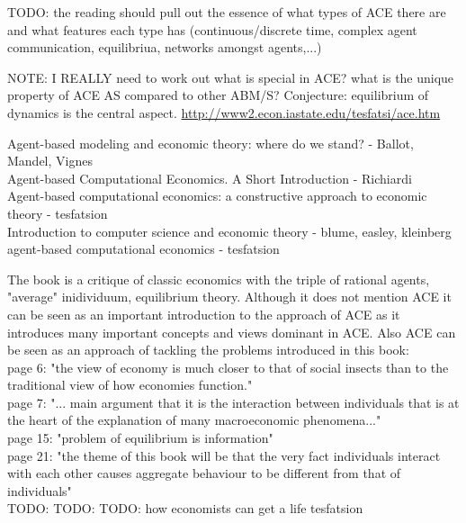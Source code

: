 TODO: the reading should pull out the essence of what types of ACE there are and what features each type has (continuous/discrete time, complex agent communication, equilibriua, networks amongst agents,...)

NOTE: I REALLY need to work out what is special in ACE? what is the unique property of ACE AS compared to other ABM/S? Conjecture: equilibrium of dynamics is the central aspect.
\url{http://www2.econ.iastate.edu/tesfatsi/ace.htm}

\cite{mandel_2015} Agent-based modeling and economic theory: where do we stand? - Ballot, Mandel, Vignes \\
\cite{richiardi_2007} Agent-based Computational Economics. A Short Introduction - Richiardi \\
\cite{tesfatsion_2006} Agent-based computational economics: a constructive approach to economic theory - tesfatsion \\
\cite{kleinberg_easley_2015} Introduction to computer science and economic theory - blume, easley, kleinberg \\
\cite{tesfatsion_2002} agent-based computational economics - tesfatsion 



The book \cite{KirmanComplex2010} is a critique of classic economics with the triple of rational agents, "average" inidividuum, equilibrium theory. Although it does not mention ACE it  can be seen as an important introduction to the approach of ACE as it introduces many important concepts and views dominant in ACE. Also ACE can be seen as an approach of tackling the problems introduced in this book: \\

page 6: "the view of economy is much closer to that of social insects than to the traditional view of how economies function." \\
page 7: "... main argument that it is the interaction between individuals that is at the heart of the explanation of many macroeconomic phenomena..." \\
page 15: "problem of equilibrium is information" \\
page 21: "the theme of this book will be that the very fact individuals interact with each other causes aggregate behaviour to be different from that of individuals" \\



TODO: \cite{Kirman2001}
TODO: \cite{Kaminski2013}
TODO: how economists can get a life  tesfatsion

